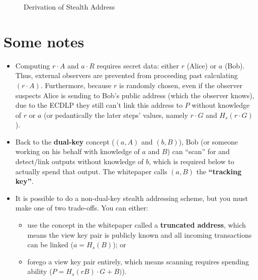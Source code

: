 \documentclass[a4paper,10pt]{article}
\begin{document}
\begin{figure}[!htbp]
	\caption{Derivation of Stealth Address}\label{fig-stealth-address-gen}
\end{figure}
\section{Some notes}
	\begin{itemize}
		\item Computing \(r\cdot A\) and \(a\cdot R\) requires secret data: either \(r\) (Alice) or \(a\) (Bob). Thus, external observers are prevented from proceeding past calculating \( (r\cdot A)\). Furthermore, because \(r\) is randomly chosen, even if the observer suspects Alice is sending to Bob's public address (which the observer knows), due to the ECDLP they still can't link this address to \(P\) without knowledge of \(r\) or \(a\) (or pedantically the later steps' values, namely \(r\cdot G\) and \(H_s(r\cdot G)\)).
		\item Back to the \textbf{dual-key} concept (\( (a,A)\) and \( (b,B)\)), Bob (or someone working on his behalf with knowledge of \(a\) and \(B\)) can ``scan'' for and detect/link outputs without knowledge of \(b\), which is required below to actually spend that output. The whitepaper calls \((a,B)\) the \textbf{``tracking key''}.
		\item It is possible to do a non-dual-key stealth addressing scheme, but you must make one of two trade-offs. You can either: 
			\begin{itemize}
				\item use the concept in the whitepaper called a \textbf{truncated address}, which means the view key pair is publicly known and all incoming transactions can be linked (\(a = H_s(B)\)); or 
				\item forego a view key pair entirely, which means scanning requires spending ability (\(P = H_s(rB)\cdot G + B)\)).
			\end{itemize}
	\end{itemize}
\end{document}
